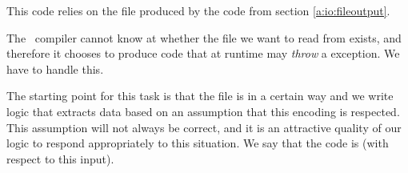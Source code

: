 \inputminted{csharp}{\context/answer/Months.cs}

This code relies on the  file produced by the code from section \ref{a:io:fileoutput}.

The \csharp\ compiler cannot know at  whether the file we want to read from exists, and therefore it chooses to produce code that at runtime may \textsl{throw} a  exception. We have to handle this.

The starting point for this task is that the file is  in a certain way and we write logic that extracts data based on an assumption that this encoding is respected. This assumption will not always be correct, and it is an attractive quality of our logic to respond appropriately to this situation. We say that the code is  (with respect to this input).
